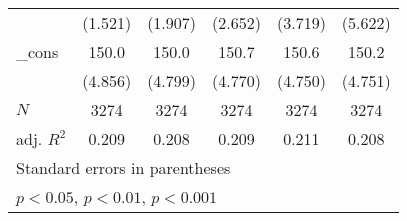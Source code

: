 {\begin{tabular}{l*{5}{c}}
            &     (1.521)         &     (1.907)         &     (2.652)         &     (3.719)         &     (5.622)         \\
[1em]
\_cons      &       150.0\sym{***}&       150.0\sym{***}&       150.7\sym{***}&       150.6\sym{***}&       150.2\sym{***}\\
            &     (4.856)         &     (4.799)         &     (4.770)         &     (4.750)         &     (4.751)         \\
\hline
\(N\)       &        3274         &        3274         &        3274         &        3274         &        3274         \\
adj. \(R^{2}\)&       0.209         &       0.208         &       0.209         &       0.211         &       0.208         \\
\hline\hline
\multicolumn{6}{l}{\footnotesize Standard errors in parentheses}\\
\multicolumn{6}{l}{\footnotesize \sym{*} \(p<0.05\), \sym{**} \(p<0.01\), \sym{***} \(p<0.001\)}\\
\end{tabular}
}

